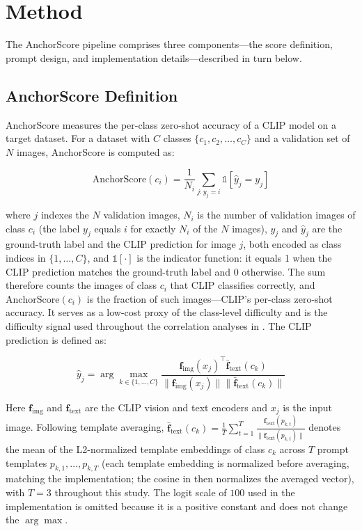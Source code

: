 \documentclass[11pt,a4paper]{article}
\begin{document}
\section{Method}
\label{sec:method}

The AnchorScore pipeline comprises three components---the score definition, prompt design, and implementation details---described in turn below.

\subsection{AnchorScore Definition}

AnchorScore measures the per-class zero-shot accuracy of a CLIP model on a target dataset. For a dataset with $C$ classes $\{c_1, c_2, \dots, c_C\}$ and a validation set of $N$ images, AnchorScore is computed as:

\begin{equation}
\text{AnchorScore}(c_i) = \frac{1}{N_i} \sum_{j : y_j = i} \mathbb{1}[\hat{y}_j = y_j]
\label{eq:anchorscore}
\end{equation}

where $j$ indexes the $N$ validation images, $N_i$ is the number of validation images of class $c_i$ (the label $y_j$ equals $i$ for exactly $N_i$ of the $N$ images), $y_j$ and $\hat{y}_j$ are the ground-truth label and the CLIP prediction for image $j$, both encoded as class indices in $\{1,\dots,C\}$, and $\mathbb{1}[\cdot]$ is the indicator function: it equals 1 when the CLIP prediction matches the ground-truth label and 0 otherwise. The sum therefore counts the images of class $c_i$ that CLIP classifies correctly, and $\text{AnchorScore}(c_i)$ is the fraction of such images---CLIP's per-class zero-shot accuracy. It serves as a low-cost proxy of the class-level difficulty and is the difficulty signal used throughout the correlation analyses in . The CLIP prediction is defined as:

\begin{equation}
\hat{y}_j = \arg\max_{k \in \{1,\dots,C\}} \frac{\mathbf{f}_{\text{img}}(x_j)^\top \bar{\mathbf{f}}_{\text{text}}(c_k)}{\|\mathbf{f}_{\text{img}}(x_j)\| \|\bar{\mathbf{f}}_{\text{text}}(c_k)\|}
\label{eq:clip_pred}
\end{equation}

Here $\mathbf{f}_{\text{img}}$ and $\mathbf{f}_{\text{text}}$ are the CLIP vision and text encoders and $x_j$ is the input image. Following template averaging, $\bar{\mathbf{f}}_{\text{text}}(c_k) = \frac{1}{T}\sum_{t=1}^{T}\frac{\mathbf{f}_{\text{text}}(p_{k,t})}{\|\mathbf{f}_{\text{text}}(p_{k,t})\|}$ denotes the mean of the L2-normalized template embeddings of class $c_k$ across $T$ prompt templates $p_{k,1}, \dots, p_{k,T}$ (each template embedding is normalized before averaging, matching the implementation; the cosine in  then normalizes the averaged vector), with $T=3$ throughout this study. The logit scale of $100$ used in the implementation is omitted because it is a positive constant and does not change the $\arg\max$.
\end{document}
